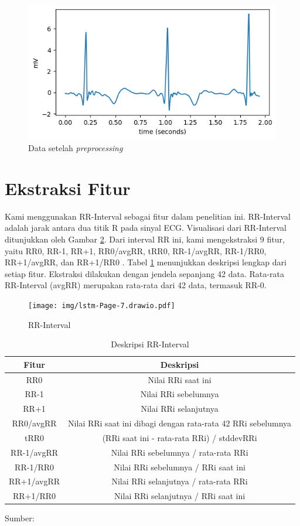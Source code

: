\begin{figure}[H]
  \centering
  \includegraphics[width=0.6\linewidth]{./img/setelah_prep.png}
  \caption{Data setelah \textit{preprocessing}}
  \label{fig:setelah-prep}
\end{figure}


\section{Ekstraksi Fitur}
\label{subsec: bab4-ekstraksi-fitur}

Kami menggunakan RR-Interval sebagai fitur dalam penelitian ini.
RR-Interval adalah jarak antara dua titik R pada sinyal ECG.
Visualisasi dari RR-Interval ditunjukkan oleh Gambar \ref{fig:rri}.
Dari interval RR ini, kami mengekstraksi 9 fitur, yaitu RR0, RR-1, RR+1, RR0/avgRR, tRR0, RR-1/avgRR, RR-1/RR0, RR+1/avgRR, dan RR+1/RR0 \parencite{pramukantoroHeartbeatClassifierContinuous2022}.
Tabel \ref{tab:rri} menunjukkan deskripsi lengkap dari setiap fitur.
Ekstraksi dilakukan dengan jendela sepanjang 42 data. Rata-rata RR-Interval (avgRR) merupakan rata-rata dari 42 data, termasuk RR-0. 

\begin{figure}[H]
  \centering
  \texttt{[image: img/lstm-Page-7.drawio.pdf]}
  \caption{RR-Interval}
  \label{fig:rri}
\end{figure}

\begin{table}[H]
  \caption{Deskripsi RR-Interval}
\begin{center}
\footnotesize
\begin{tabular}{c @{\hspace{1cm}} c}
\hline
Fitur & Deskripsi\\
\hline
RR0 & Nilai RRi saat ini\\
RR-1 & Nilai RRi sebelumnya\\
RR+1  & Nilai RRi selanjutnya\\
RR0/avgRR & Nilai RRi saat ini dibagi dengan rata-rata 42 RRi sebelumnya\\
tRR0  & (RRi saat ini - rata-rata RRi) / stddevRRi\\
RR-1/avgRR & Nilai RRi sebelumnya / rata-rata RRi\\
RR-1/RR0 & Nilai RRi sebelumnya / RRi saat ini\\
RR+1/avgRR & Nilai RRi selanjutnya / rata-rata RRi\\
RR+1/RR0 & Nilai RRi selanjutnya / RRi saat ini\\
\hline
\end{tabular}
\end{center}
\center
Sumber: \textcite{pramukantoroHeartbeatClassifierContinuous2022}
\label{tab:rri}
\end{table}

